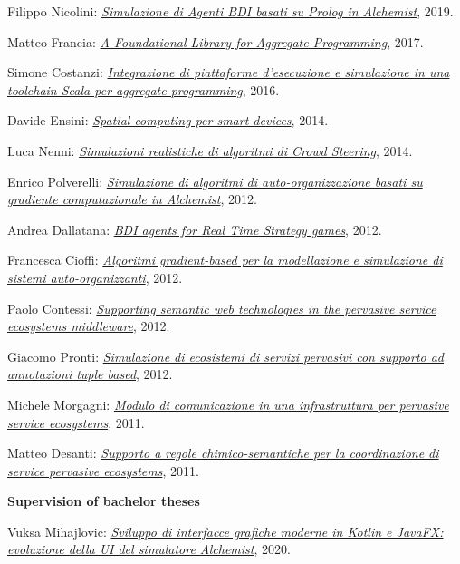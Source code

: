 \begin{outerlist}
\begin{innerlist}
      \item Filippo Nicolini: \href{http://amslaurea.unibo.it/19521/}{\textit{Simulazione di Agenti BDI basati su Prolog in Alchemist}}, 2019.
      \item Matteo Francia: \href{http://amslaurea.unibo.it/13090/}{\textit{A Foundational Library for Aggregate Programming}}, 2017.
      \item Simone Costanzi: \href{http://amslaurea.unibo.it/10519/}{\textit{Integrazione di piattaforme d'esecuzione e simulazione in una toolchain Scala per aggregate programming}}, 2016.
      \item Davide Ensini: \href{http://amslaurea.unibo.it/7990/}{\textit{Spatial computing per smart devices}}, 2014.
      \item Luca Nenni: \href{http://amslaurea.unibo.it/6927/}{\textit{Simulazioni realistiche di algoritmi di Crowd Steering}}, 2014.
      \item Enrico Polverelli: \href{http://amslaurea.unibo.it/5293/}{\textit{Simulazione di algoritmi di auto-organizzazione basati su gradiente computazionale in Alchemist}}, 2012.
      \item Andrea Dallatana: \href{http://amslaurea.unibo.it/4217/}{\textit{BDI agents for Real Time Strategy games}}, 2012.
      \item Francesca Cioffi: \href{http://amslaurea.unibo.it/4088/}{\textit{Algoritmi gradient-based per la modellazione e simulazione di sistemi auto-organizzanti}}, 2012.
      \item Paolo Contessi: \href{http://amslaurea.unibo.it/4074/}{\textit{Supporting semantic web technologies in the pervasive service ecosystems middleware}}, 2012.
      \item Giacomo Pronti: \href{http://archive.fo/nBeOg}{\textit{Simulazione di ecosistemi di servizi pervasivi con supporto ad annotazioni tuple based}}, 2012.
      \item Michele Morgagni: \href{http://archive.fo/6mnSN}{\textit{Modulo di comunicazione in una infrastruttura per pervasive service ecosystems}}, 2011.
      \item Matteo Desanti: \href{http://archive.fo/rwla1}{\textit{Supporto a regole chimico-semantiche per la coordinazione di service pervasive ecosystems}}, 2011.
    \end{innerlist}
\item[] \textbf{Supervision of bachelor theses} %
    \begin{innerlist}
      \item Vuksa Mihajlovic: \href{http://amslaurea.unibo.it/21648/}{\textit{Sviluppo di interfacce grafiche moderne in Kotlin e JavaFX: evoluzione della UI del simulatore Alchemist}}, 2020.

\end{innerlist}
\end{outerlist}
